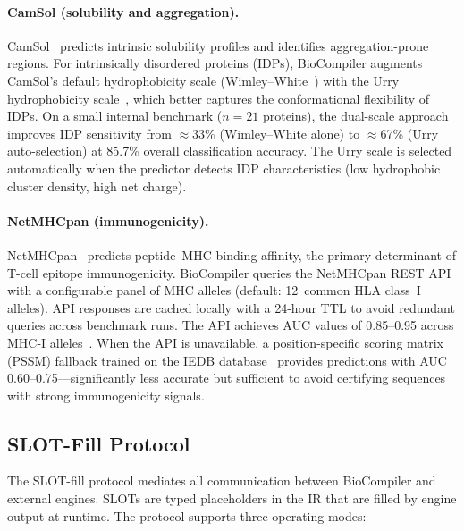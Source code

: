 \documentclass[acmsmall,review,anonymous]{acmart}
\begin{document}
\paragraph{CamSol (solubility and aggregation).}
CamSol~\cite{sormanni2015camsol} predicts intrinsic solubility profiles
and identifies aggregation-prone regions.  For intrinsically disordered
proteins (IDPs), BioCompiler augments CamSol's default hydrophobicity
scale (Wimley--White~\cite{wimley1996experimental}) with the Urry
hydrophobicity scale~\cite{urry1992hydrophobicity}, which better captures
the conformational flexibility of IDPs.  On a small internal benchmark ($n = 21$ proteins), the
dual-scale approach improves IDP sensitivity from $\approx$33\% (Wimley--White alone)
to $\approx$67\% (Urry auto-selection) at 85.7\% overall classification accuracy.  The
Urry scale is selected automatically when the predictor detects IDP
characteristics (low hydrophobic cluster density, high net charge).

\paragraph{NetMHCpan (immunogenicity).}
NetMHCpan~\cite{reynisson2020netmhcpan} predicts peptide--MHC binding
affinity, the primary determinant of T-cell epitope immunogenicity.
BioCompiler queries the NetMHCpan REST API with a configurable panel of
MHC alleles (default: 12~common HLA class~I alleles).  API responses are
cached locally with a 24-hour TTL to avoid redundant queries across
benchmark runs.  The API achieves AUC values of 0.85--0.95 across MHC-I
alleles~\cite{reynisson2020netmhcpan}.  When the API is unavailable, a
position-specific scoring matrix (PSSM) fallback trained on the IEDB
database~\cite{vita2019iedb} provides predictions with AUC
0.60--0.75---significantly less accurate but sufficient to avoid
certifying sequences with strong immunogenicity signals.

\subsection{SLOT-Fill Protocol}\label{sec:slot-fill}

The SLOT-fill protocol mediates all communication between BioCompiler and
external engines.  SLOTs are typed placeholders in the IR that are filled
by engine output at runtime.  The protocol supports three operating
modes:
\end{document}
